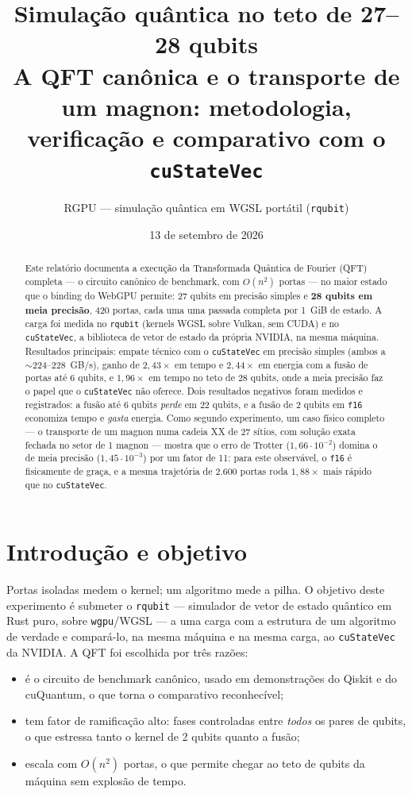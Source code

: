 \documentclass[11pt,a4paper]{article}
\title{Simulação quântica no teto de 27--28 qubits\\
\large A QFT canônica e o transporte de um magnon: metodologia, verificação
e comparativo com o \texttt{cuStateVec}}
\author{RGPU --- simulação quântica em WGSL portátil (\texttt{rqubit})}
\date{13 de setembro de 2026}
\begin{document}
\maketitle

\begin{abstract}
Este relatório documenta a execução da Transformada Quântica de Fourier (QFT)
completa --- o circuito canônico de benchmark, com $O(n^2)$ portas --- no maior
estado que o binding do WebGPU permite: 27 qubits em precisão simples e
\textbf{28 qubits em meia precisão}, 420 portas, cada uma uma passada completa
por 1~GiB de estado. A carga foi medida no \texttt{rqubit} (kernels WGSL sobre
Vulkan, sem CUDA) e no \texttt{cuStateVec}, a biblioteca de vetor de estado da
própria NVIDIA, na mesma máquina. Resultados principais: empate técnico com o
\texttt{cuStateVec} em precisão simples (ambos a $\sim$224--228~GB/s), ganho de
$2{,}43\times$ em tempo e $2{,}44\times$ em energia com a fusão de portas até
6 qubits, e $1{,}96\times$ em tempo no teto de 28 qubits, onde a meia precisão
faz o papel que o \texttt{cuStateVec} não oferece. Dois resultados negativos
foram medidos e registrados: a fusão até 6 qubits \emph{perde} em 22 qubits, e
a fusão de 2 qubits em \texttt{f16} economiza tempo e \emph{gasta} energia.
Como segundo experimento, um caso físico completo --- o transporte de um
magnon numa cadeia XX de 27 sítios, com solução exata fechada no setor de 1
magnon --- mostra que o erro de Trotter ($1{,}66\cdot10^{-2}$) domina o de
meia precisão ($1{,}45\cdot10^{-3}$) por um fator de 11: para este observável,
o \texttt{f16} é fisicamente de graça, e a mesma trajetória de 2.600 portas
roda $1{,}88\times$ mais rápido que no \texttt{cuStateVec}.
\end{abstract}

\section{Introdução e objetivo}

Portas isoladas medem o kernel; um algoritmo mede a pilha. O objetivo deste
experimento é submeter o \texttt{rqubit} --- simulador de vetor de estado
quântico em Rust puro, sobre \texttt{wgpu}/WGSL --- a uma carga com a estrutura
de um algoritmo de verdade e compará-lo, na mesma máquina e na mesma carga, ao
\texttt{cuStateVec} da NVIDIA. A QFT foi escolhida por três razões:

\begin{itemize}
\item é o circuito de benchmark canônico, usado em demonstrações do Qiskit e do
  cuQuantum, o que torna o comparativo reconhecível;
\item tem fator de ramificação alto: fases controladas entre \emph{todos} os
  pares de qubits, o que estressa tanto o kernel de 2 qubits quanto a fusão;
  \item escala com $O(n^2)$ portas, o que permite chegar ao teto de qubits da
  máquina sem explosão de tempo.
\end{itemize}
\end{document}
